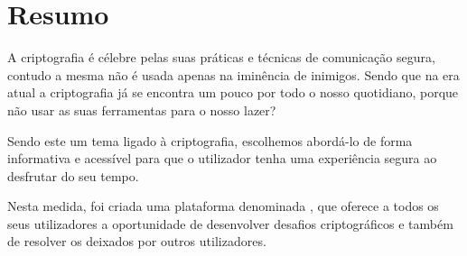 \chapter*{Resumo}
\label{chap:resumo}

A criptografia é célebre pelas suas práticas e técnicas de comunicação segura, contudo a mesma não é usada apenas na iminência de inimigos. Sendo que na era atual a criptografia já se encontra um pouco por todo o nosso quotidiano, porque não usar as suas ferramentas para o nosso lazer?

Sendo este um tema ligado à criptografia, escolhemos abordá-lo de forma informativa e acessível para que o utilizador tenha uma experiência segura ao desfrutar do seu tempo.

Nesta medida, foi criada uma plataforma denominada \appname, que oferece a todos os seus utilizadores a oportunidade de desenvolver desafios criptográficos e também de resolver os deixados por outros utilizadores.

